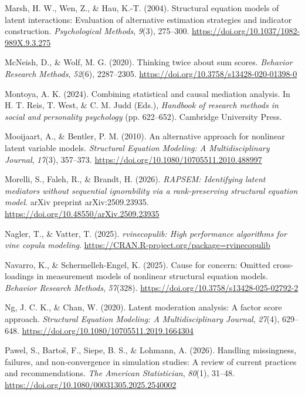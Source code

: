 \documentclass[
  man,
  longtable,
  nolmodern,
  notxfonts,
  notimes,
  colorlinks=true,linkcolor=blue,citecolor=blue,urlcolor=blue]{apa7}
\newlength{\cslhangindent}
\newenvironment{CSLReferences}[2] %
 {\begin{list}{}{%
  \setlength{\itemindent}{0pt}
  \setlength{\leftmargin}{0pt}
  \setlength{\parsep}{0pt}
  \ifodd #1
   \setlength{\leftmargin}{\cslhangindent}
   \setlength{\itemindent}{-1\cslhangindent}
  \fi
  \setlength{\itemsep}{#2\baselineskip}}}
 {\end{list}}
\begin{document}
\begin{CSLReferences}{1}{0}
Marsh, H. W., Wen, Z., \& Hau, K.-T. (2004). Structural equation models
of latent interactions: Evaluation of alternative estimation strategies
and indicator construction. \emph{Psychological Methods}, \emph{9}(3),
275--300. \url{https://doi.org/10.1037/1082-989X.9.3.275}

McNeish, D., \& Wolf, M. G. (2020). Thinking twice about sum scores.
\emph{Behavior Research Methods}, \emph{52}(6), 2287--2305.
\url{https://doi.org/10.3758/s13428-020-01398-0}

Montoya, A. K. (2024). Combining statistical and causal mediation
analysis. In H. T. Reis, T. West, \& C. M. Judd (Eds.), \emph{Handbook
of research methods in social and personality psychology} (pp.
622--652). Cambridge University Press.

Mooijaart, A., \& Bentler, P. M. (2010). An alternative approach for
nonlinear latent variable models. \emph{Structural Equation Modeling: A
Multidisciplinary Journal}, \emph{17}(3), 357--373.
\url{https://doi.org/10.1080/10705511.2010.488997}

Morelli, S., Faleh, R., \& Brandt, H. (2026). \emph{{RAPSEM}:
Identifying latent mediators without sequential ignorability via a
rank-preserving structural equation model}. arXiv preprint
arXiv:2509.23935. \url{https://doi.org/10.48550/arXiv.2509.23935}

Nagler, T., \& Vatter, T. (2025). \emph{{rvinecopulib}: High performance
algorithms for vine copula modeling}.
\url{https://CRAN.R-project.org/package=rvinecopulib}

Navarro, K., \& Schermelleh-Engel, K. (2025). Cause for concern: Omitted
cross-loadings in measurement models of nonlinear structural equation
models. \emph{Behavior Research Methods}, \emph{57}(328).
\url{https://doi.org/10.3758/s13428-025-02792-2}

Ng, J. C. K., \& Chan, W. (2020). Latent moderation analysis: A factor
score approach. \emph{Structural Equation Modeling: A Multidisciplinary
Journal}, \emph{27}(4), 629--648.
\url{https://doi.org/10.1080/10705511.2019.1664304}

Pawel, S., Bartoš, F., Siepe, B. S., \& Lohmann, A. (2026). Handling
missingness, failures, and non-convergence in simulation studies: A
review of current practices and recommendations. \emph{The American
Statistician}, \emph{80}(1), 31--48.
\url{https://doi.org/10.1080/00031305.2025.2540002}


\end{CSLReferences}
\end{document}
